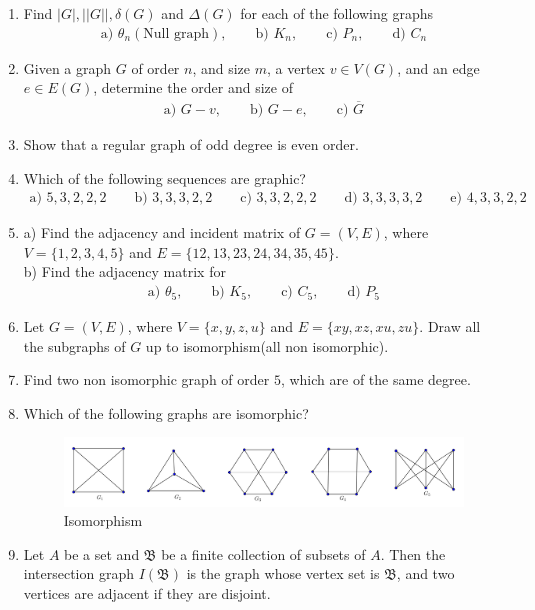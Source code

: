 \documentclass[paper=a4, fontsize=11pt,twoside]{scrartcl}		%
\theoremstyle{definition}
\theoremstyle{remark}
\begin{document}
\begin{enumerate}
  \item Find $|G|,||G||,\delta(G)$ and $\Delta(G)$ for each of the following graphs
  \begin{align*}
   \text{a) }\theta_n(\text{Null graph}),\qquad \text{b) } K_n, \qquad \text{c) }P_n, \qquad \text{d) } C_n
  \end{align*}
  \item Given a graph $G$ of order $n$, and size $m$, a vertex $v\in V(G)$, and an edge $e\in E(G)$, determine the order and size of
      \begin{align*}
      \text{a) } G-v,\qquad \text{b) } G-e,\qquad \text{c) } \overline{G}
      \end{align*}
  \item Show that a regular graph of odd degree is even order.
  \item Which of the following sequences are graphic?
  \begin{align*}
   \text{a) }5,3,2,2,2 \qquad \text{b) }3,3,3,2,2 \qquad \text{c) }3,3,2,2,2 \qquad \text{d) } 3,3,3,3,2 \qquad \text{e) } 4,3,3,2,2
  \end{align*}
  \item a) Find the adjacency and incident matrix of $G=(V,E)$, where $V=\{1,2,3,4,5\}$ and
      $E=\{12,13,23,24,34,35,45\}$.\\
        b) Find the adjacency matrix for
  \begin{align*}
      \text{a) } \theta_5,\qquad \text{b) } K_5,\qquad \text{c) } C_5,\qquad \text{d) } P_5
      \end{align*}
  \item Let $G=(V,E)$, where $V=\{x,y,z,u\}$ and $E=\{xy,xz,xu,zu\}$. Draw all the subgraphs of $G$ up to isomorphism(all non isomorphic).
  \item Find two non isomorphic graph of order $5$, which are of the same degree.
  \item Which of the following graphs are isomorphic?
\begin{figure}[hbt!]
\centering
\includegraphics[width=1.0\textwidth]{GrapAss1.png}
\caption{Isomorphism}\label{fig1}
\end{figure}
\item Let $A$ be a set and $\mathfrak{B}$ be a finite collection of subsets of $A$. Then the intersection graph $I(\mathfrak{B})$ is the graph whose vertex set is $\mathfrak{B}$, and two vertices are adjacent if they are disjoint.\\

\end{enumerate}
\end{document}

